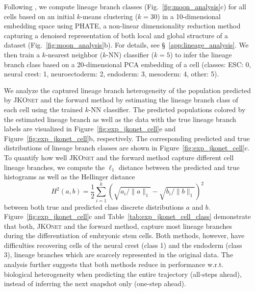 Following \citet[Fig. 6, Suppl. Note 4]{moon2019}, we compute lineage branch classes (Fig.~\ref{fig:moon_analysis}c) for all cells based on an initial $k$-means clustering ($k=30$) in a 10-dimensional embedding space using PHATE, a non-linear dimensionality reduction method capturing a denoised representation of both local and global structure of a dataset (Fig.~\ref{fig:moon_analysis}b).
For details, see \S~\ref{app:lineage_analysis}.
We then train a $k$-nearest neighbor ($k$-NN) classifier ($k=5$) to infer the lineage branch class based on a 20-dimensional PCA embedding of a cell (classes: ESC: 0, neural crest: 1, neuroectoderm: 2, endoderm: 3, mesoderm: 4, other: 5).

We analyze the captured lineage branch heterogeneity of the population predicted by \textsc{JKOnet} and the forward method by estimating the lineage branch class of each cell using the trained $k$-NN classifier. The predicted populations colored by the estimated lineage branch as well as the data with the true lineage branch labels are visualized in Figure~\ref{fig:exp_jkonet_cell}e and Figure~\ref{fig:exp_jkonet_cell}b, respectively.
The corresponding predicted and true distributions of lineage branch classes are shown in Figure~\ref{fig:exp_jkonet_cell}c.
To quantify how well \textsc{JKOnet} and the forward method capture  different cell lineage branches, we compute the $\ell_1$ distance between the  predicted and true histograms as well as the Hellinger distance 
\begin{equation} \label{eq:hellinger}
    H^2(a, b)=\frac{1}{2} \sum_{i=1}^{k}\left(\sqrt{a_{i}/\|a\|_1}-\sqrt{b_{i}/\|b\|_1}\right)^{2}
\end{equation}
between both true and predicted class discrete distributions $a$ and $b$.
Figure~\ref{fig:exp_jkonet_cell}c and Table~\ref{tab:exp_jkonet_cell_class} demonstrate that both, \textsc{JKOnet} and the forward method, capture most lineage branches during the differentiation of embryonic stem cells. Both methods, however, have difficulties recovering cells of the neural crest (class 1) and the endoderm (class 3), lineage branches which are scarcely represented in the original data. 
The analysis further suggests that both methods reduce in performance w.r.t. biological heterogeneity when predicting the entire trajectory (all-steps ahead), instead of inferring the next snapshot only (one-step ahead).


